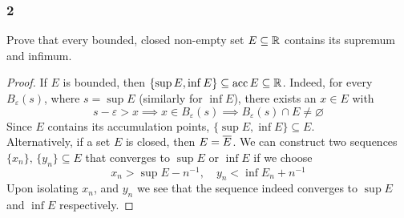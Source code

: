 \documentclass[../main.tex]{subfiles}
\begin{document}
\subsubsection*{2}
\begin{wts}
    Prove that every bounded, closed non-empty set $E\subseteq\mathbb{R}$ contains its supremum and infimum.
\end{wts}
\begin{proof}
    If $E$ is bounded, then $\{\sup E,\inf E\}\subseteq \operatorname{acc}{E}\subseteq\mathbb{R}$. Indeed, for every $B_\varepsilon(s)$, where $s=\sup E$ (similarly for $\inf E$), there exists an $x\in E$ with
    \[s-\varepsilon>x\implies x\in B_{\varepsilon}(s)\implies B_\varepsilon(s)\cap E\neq\varnothing\]
    Since $E$ contains its accumulation points, $\{\sup E,\inf E\}\subseteq E$.\\
    
    Alternatively, if a set $E$ is closed, then $E=\overline{E}$. We can construct two sequences $\{x_n\},\,\{y_n\}\subseteq E$ that converges to $\sup E$ or $\inf E$ if we choose
    \[x_n>\sup E - n^{-1},\quad y_n<\inf E_n + n^{-1}\]
    Upon isolating $x_n$, and $y_n$ we see that the sequence indeed converges to $\sup E$ and $\inf E$ respectively.
\end{proof}
\end{document}
